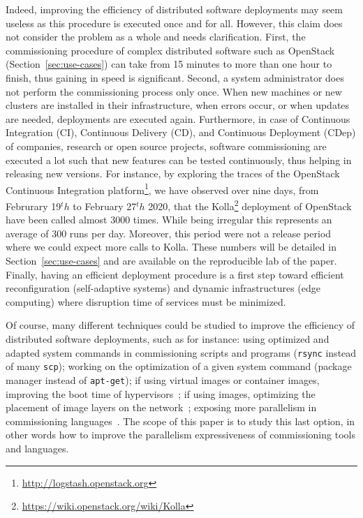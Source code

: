 Indeed, improving the efficiency of distributed software deployments may seem useless as this procedure is executed once and for all. However, this claim does not consider the problem as a whole and needs clarification. %
First, the commissioning procedure of complex distributed software such as OpenStack (Section~\ref{sec:use-cases}) can take from 15 minutes to more than
one hour to finish, thus gaining in speed is significant. Second, a system
administrator does not perform the commissioning process only once. When new
machines or new clusters are installed in their infrastructure, when errors
occur, or when updates are needed, deployments are executed again.
%
Furthermore, in case of Continuous Integration (CI), Continuous Delivery (CD), and Continuous Deployment (CDep) of companies, research or open source projects, software commissioning are executed a lot such that new features can be tested continuously, thus helping in releasing new versions. For instance, by exploring the traces of the OpenStack Continuous Integration platform\footnote{\url{http://logstash.openstack.org}}, we have observed over nine days, from Februrary 19$^th$ to February 27$^th$ 2020, that the Kolla\footnote{\url{https://wiki.openstack.org/wiki/Kolla}} deployment  of OpenStack have been called almost 3000 times. While being irregular this represents an average of 300 runs per day. Moreover, this period were not a release period where we could expect more calls to Kolla. These numbers will be detailed in Section~\ref{sec:use-cases} and are available on the reproducible lab of the paper.
%
Finally, having an efficient deployment procedure is a first step toward efficient reconfiguration (\eg self-adaptive systems) and dynamic infrastructures (\eg edge computing) where disruption time of services must be minimized.

Of course, many different techniques could be studied to improve the efficiency of distributed software deployments, such as for instance: using optimized and adapted system commands in commissioning scripts and programs (\eg \texttt{rsync} instead of many \texttt{scp}); working on the optimization of a given system command (\eg \nix package manager instead of \texttt{apt-get}); if using virtual images or container images, improving the boot time of hypervisors~\cite{nguyen:hal-02172288}; if using \docker images, optimizing the placement of image layers on the network~\cite{darrous:hal-01745405}; exposing more parallelism in commissioning languages~\cite{dicosmo:hal-01233489}. The scope of this paper is to study this last option, in other words how to improve the parallelism expressiveness of commissioning tools and languages.